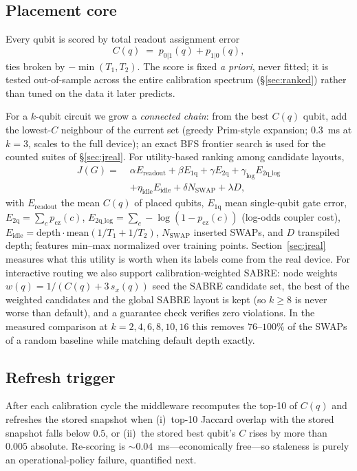 \documentclass[journal,10pt,twocolumn]{IEEEtran}
\begin{document}
\subsection{Placement core}
\label{sec:score}
Every qubit is scored by total readout assignment error
\begin{equation}
C(q)\;=\;p_{0|1}(q)+p_{1|0}(q),
\label{eq:cscore}
\end{equation}
ties broken by $-\min(T_1,T_2)$. The score is fixed \emph{a priori}, never fitted; it is tested out-of-sample
across the entire calibration spectrum (\S\ref{sec:ranked}) rather than tuned on the data it later predicts.

For a $k$-qubit circuit we grow a \emph{connected chain}: from the best $C(q)$ qubit, add the lowest-$C$
neighbour of the current set (greedy Prim-style expansion; $0.3$~ms at $k{=}3$, scales to the full device);
an exact BFS frontier search is used for the counted suites of \S\ref{sec:jreal}. For utility-based ranking among
candidate layouts,
\begin{equation}
\begin{aligned}
J(G)=\;&\alpha E_{\mathrm{readout}}+\beta E_{\mathrm{1q}}+\gamma E_{\mathrm{2q}}
+\gamma_{\log}E_{\mathrm{2q\_log}}\\
&+\eta_{\mathrm{idle}}E_{\mathrm{idle}}+\delta N_{\mathrm{SWAP}}+\lambda D,
\end{aligned}
\label{eq:j7}
\end{equation}
with $E_{\mathrm{readout}}$ the mean $C(q)$ of placed qubits, $E_{\mathrm{1q}}$ mean single-qubit gate error,
$E_{\mathrm{2q}}=\sum_c p_{\mathrm{cz}}(c)$, $E_{\mathrm{2q\_log}}=\sum_c-\log(1-p_{\mathrm{cz}}(c))$ (log-odds
coupler cost), $E_{\mathrm{idle}}=\mathrm{depth}\cdot\mathrm{mean}(1/T_1+1/T_2)$, $N_{\mathrm{SWAP}}$ inserted
SWAPs, and $D$ transpiled depth; features min--max normalized over training points. Section~\ref{sec:jreal}
measures what this utility is worth when its labels come from the real device. For interactive routing we also
support calibration-weighted SABRE: node weights $w(q)=1/(C(q)+3\,s_x(q))$ seed the SABRE candidate set, the best
of the weighted candidates and the global SABRE layout is kept (so $k\ge8$ is never worse than default), and a
guarantee check verifies zero violations. In the measured comparison at $k=2,4,6,8,10,16$ this removes
$76$--$100\%$ of the SWAPs of a random baseline while matching default depth exactly.

\subsection{Refresh trigger}
\label{sec:trigger}
After each calibration cycle the middleware recomputes the top-10 of $C(q)$ and refreshes the stored snapshot when
(i)~top-10 Jaccard overlap with the stored snapshot falls below $0.5$, or (ii)~the stored best qubit's $C$ rises by
more than $0.005$ absolute. Re-scoring is $\sim0.04$~ms---economically free---so staleness is purely an
operational-policy failure, quantified next.
\end{document}
